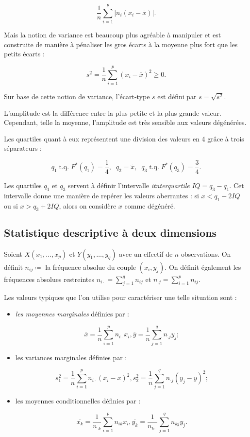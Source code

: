 \documentclass{article}
\DeclareMathOperator{\tq}{\text{ t.q. }}
\begin{document}
			\[\frac 1n\sum_{i=1}^p|n_i(x_i-\overline x)|.\]

			Mais la notion de variance est beaucoup plus agréable à manipuler et est construite de manière à pénaliser les gros écarts à la moyenne plus fort que les petits
			écarts :

			\[s^2 = \frac 1n\sum_{i=1}^p(x_i-\overline x)^2 \geq 0.\]

			Sur base de cette notion de variance, l'écart-type $s$ est défini par $s = \sqrt{s^2}$.

			L'amplitude est la différence entre la plus petite et la plus grande valeur. Cependant, telle la moyenne, l'amplitude est très sensible aux valeurs dégénérées.

			Les quartiles quant à eux représentent une division des valeurs en 4 grâce à trois séparateurs :

			\[q_1 \tq F^*(q_1) = \frac 14, \;\;q_2 = \widetilde x,\;\; q_3 \tq F^*(q_3) = \frac 34.\]

			Les quartiles $q_1$ et $q_3$ servent à définir l'intervalle \textit{itnterquartile} $IQ = q_3-q_1$. Cet intervalle donne une manière de repérer les valeurs
			aberrantes : si $x < q_1 - 2IQ$ ou si $x > q_3 + 2IQ$, alors on considère $x$ comme dégénéré.

	\subsection{Statistique descriptive à deux dimensions}
		Soient $X(x_1, \ldots, x_p)$ et $Y(y_1, \ldots, y_q)$ avec un effectif de $n$ observations. On définit $n_{ij} \coloneqq$ la fréquence absolue du couple $(x_i, y_j)$.
		On définit également les fréquences absolues restreintes $n_{i \cdot} = \sum_{j=1}^qn_{ij}$ et $n_{\cdot j} = \sum_{i=1}^pn_{ij}$.

		Les valeurs typiques que l'on utilise pour caractériser une telle situation sont :

		\begin{itemize}
			\item \textit{les moyennes marginales} définies par :

			\[\overline x = \frac 1n\sum_{i=1}^pn_{i\cdot}x_i, \overline y = \frac 1n \sum_{j=1}^qn_{\cdot j}y_j ;\]

			\item les variances marginales définies par :

			\[s_1^2 = \frac 1n\sum_{i=1}^pn_{i\cdot}(x_i-\overline x)^2, s_2^2 = \frac 1n\sum_{j=1}^qn_{\cdot j}(y_j-\overline y)^2 ;\]

			\item les moyennes conditionnelles définies par :

			\[\overline{x_k} = \frac 1{n_{\cdot k}}\sum_{i=1}^pn_{ik}x_i, \overline{y_k} = \frac 1{n_{k\cdot}} \sum_{j=1}^qn_{kj}y_j.\]
		\end{itemize}
\end{document}
